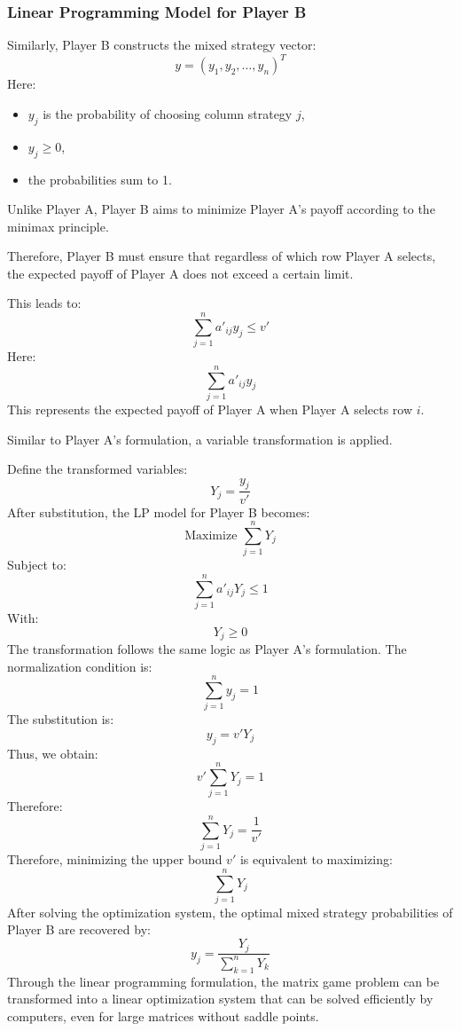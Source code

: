 \documentclass[12pt,a4paper]{article}
\begin{document}
\subsubsection{Linear Programming Model for Player B}

Similarly, Player B constructs the mixed strategy vector:
\[
y=(y_1,y_2,\dots,y_n)^T
\]
Here:
\begin{itemize}
    \item \(y_j\) is the probability of choosing column strategy \(j\),
    \item \(y_j \ge 0\),
    \item the probabilities sum to 1.
\end{itemize}
Unlike Player A, Player B aims to minimize Player A's payoff according to the minimax principle.

Therefore, Player B must ensure that regardless of which row Player A selects, the expected payoff of Player A does not exceed a certain limit.

This leads to:
\[
\sum_{j=1}^{n}a'_{ij}y_j \le v'
\]
Here:
\[
\sum_{j=1}^{n}a'_{ij}y_j
\]
This represents the expected payoff of Player A when Player A selects row \(i\).

Similar to Player A's formulation, a variable transformation is applied. 

Define the transformed variables:
\[
Y_j=\frac{y_j}{v'}
\]
\vspace{0.1cm}
After substitution, the LP model for Player B becomes:
\vspace{0.1cm}
\[
\text{Maximize } \sum_{j=1}^{n}Y_j
\]
Subject to:
\[
\sum_{j=1}^{n}a'_{ij}Y_j \le 1
\] \cite{thie2008}
With:
\[
Y_j \ge 0
\]
The transformation follows the same logic as Player A's formulation. The normalization condition is:
\vspace{0.1cm}
\[
\sum_{j=1}^{n}y_j=1
\]
The substitution is:
\[
y_j=v'Y_j
\]
Thus, we obtain:
\[
v'\sum_{j=1}^{n}Y_j=1
\]
Therefore:
\[
\sum_{j=1}^{n}Y_j=\frac1{v'}
\]
\vspace{0.1cm}
Therefore, minimizing the upper bound \(v'\) is equivalent to maximizing:
\vspace{0.1cm}
\[
\sum_{j=1}^{n}Y_j
\]
After solving the optimization system, the optimal mixed strategy probabilities of Player B are recovered by:
\[
y_j=
\frac{Y_j}
{\sum_{k=1}^{n}Y_k}
\]
\vspace{0.15cm}
Through the linear programming formulation, the matrix game problem can be transformed into a linear optimization system that can be solved efficiently by computers, even for large matrices without saddle points.
\end{document}

